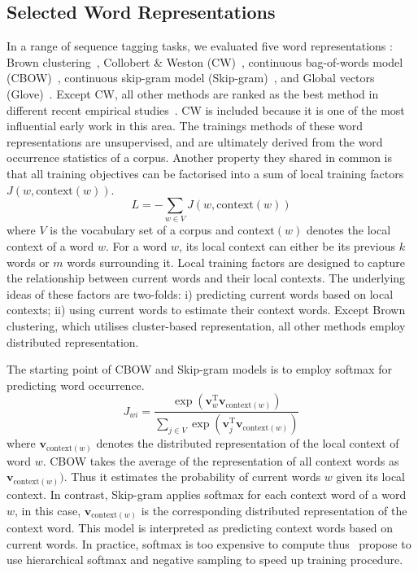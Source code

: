 \subsection{Selected Word Representations}
In a range of sequence tagging tasks, we evaluated five word representations : Brown clustering~\cite{Brown92class-basedn-gram}, Collobert \& Weston (CW)~\cite{collobert2011natural}, continuous bag-of-words model (CBOW)~\cite{}, continuous skip-gram model (Skip-gram)~\cite{}, and Global vectors (Glove)~\cite{}. Except CW, all other methods are ranked as the best method in different recent empirical studies~\cite{}. CW is included because it is one of the most influential early work in this area. The trainings methods of these word representations are unsupervised, and are ultimately derived from the word occurrence statistics of a corpus. Another property they shared in common is that all training objectives can be factorised into a sum of local training factors $J(w, \text{context}(w))$. 
\begin{equation}
L = - \sum_{w \in V} J(w, \text{context}(w))
\end{equation}
where $V$ is the vocabulary set of a corpus and $\text{context}(w)$ denotes the local context of a word $w$. For a word $w$, its local context can either be its previous $k$ words or $m$ words surrounding it. Local training factors are designed to capture the relationship between current words and their local contexts. The underlying ideas of these factors are two-folds: i) predicting current words based on local contexts; ii) using current words to estimate their context words. Except Brown clustering, which utilises cluster-based representation, all other methods employ distributed representation.

The starting point of CBOW and Skip-gram models is to employ softmax for predicting word occurrence.
\begin{equation}
J_{wi} = \frac{\exp(\mathbf{v}_w^{\text{T}} \mathbf{v}_{\text{context}(w)})}{\sum_{j \in V} \exp(\mathbf{v}_j^{\text{T}} \mathbf{v}_{\text{context}(w)})}
\end{equation}
where $\mathbf{v}_{\text{context}(w)}$ denotes the distributed representation of the local context of word $w$. CBOW takes the average of the representation of all context words as $\mathbf{v}_{\text{context}(w)})$. Thus it estimates the probability of current words $w$ given its local context. In contrast, Skip-gram applies softmax for each context word of a word $w$, in this case, $\mathbf{v}_{\text{context}(w)}$ is the corresponding distributed representation of the context word. This model is interpreted as predicting context words based on current words. In practice, softmax is too expensive to compute thus~\newcite{} propose to use hierarchical softmax and negative sampling to speed up training procedure.

